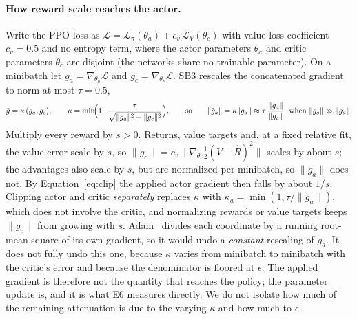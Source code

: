 \paragraph{How reward scale reaches the actor.}
Write the PPO loss as $\mathcal L=\mathcal L_\pi(\theta_a)+c_v\,\mathcal L_V(\theta_c)$ with value-loss coefficient
$c_v=0.5$ and no entropy term, where the actor parameters $\theta_a$ and critic parameters $\theta_c$ are
disjoint (the networks share no trainable parameter). On a minibatch let $g_a=\nabla_{\theta_a}\mathcal L$
and $g_c=\nabla_{\theta_c}\mathcal L$. SB3 rescales the concatenated gradient to norm at most $\tau=0.5$,
\begin{equation}
\tilde g=\kappa\,(g_a,g_c),\qquad \kappa=\min\!\Bigl(1,\;\frac{\tau}{\sqrt{\|g_a\|^2+\|g_c\|^2}}\Bigr),
\qquad\text{so}\qquad \|\tilde g_a\|=\kappa\|g_a\|\approx\tau\,\frac{\|g_a\|}{\|g_c\|}\ \ \text{when}\ \|g_c\|\gg\|g_a\|.
\label{eq:clip}
\end{equation}
Multiply every reward by $s>0$. Returns, value targets and, at a fixed relative fit, the value error scale by
$s$, so $\|g_c\|=c_v\|\nabla_{\theta_c}\tfrac12(V-\hat R)^2\|$ scales by about $s$; the advantages also scale by
$s$, but are normalized per minibatch, so $\|g_a\|$ does not. By Equation~\ref{eq:clip} the applied actor
gradient then falls by about $1/s$. Clipping actor and critic \emph{separately} replaces $\kappa$ with
$\kappa_a=\min(1,\tau/\|g_a\|)$, which does not involve the critic, and normalizing rewards or value targets
keeps $\|g_c\|$ from growing with $s$. Adam~\citep{kingma2015adam} divides each coordinate by a running
root-mean-square of its own gradient, so it would undo a \emph{constant} rescaling of $\tilde g_a$. It does not
fully undo this one, because $\kappa$ varies from minibatch to minibatch with the critic's error and because
the denominator is floored at $\epsilon$. The applied gradient is therefore not the quantity that reaches the
policy; the parameter update is, and it is what E6 measures directly. We do not isolate how much of the
remaining attenuation is due to the varying $\kappa$ and how much to $\epsilon$.

